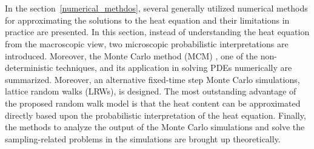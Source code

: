 \section{}

In the section~\ref{numerical_methdos}, several generally utilized
numerical methods \cite{grossmann2007numerical}\cite{zlamal1968finite}
\cite{eymard2000finite} \cite{attaway1991boundary} for approximating
the solutions to the heat equation and their limitations in practice
are presented. In this section, instead of understanding the heat
equation from the macroscopic view, two microscopic probabilistic
interpretations are introduced. Moreover, the Monte Carlo method (MCM)
\cite{rubinstein2016simulation} \cite{kroese2014monte}, one of the
non-deterministic techniques, and its application in solving PDEs
numerically are summarized. Moreover, an alternative fixed-time step
Monte Carlo simulations, lattice random walks (LRWs), is designed. The
most outstanding advantage of the proposed random walk model is that
the heat content can be approximated directly based upon the
probabilistic interpretation of the heat equation.  Finally, the
methods to analyze the output of the Monte Carlo simulations and solve
the sampling-related problems in the simulations are brought up
theoretically.





